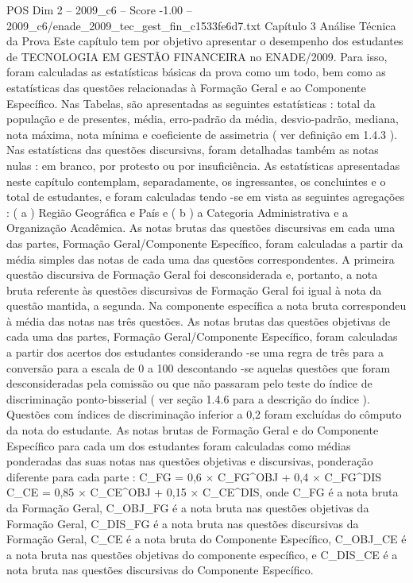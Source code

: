 \begin{textsample}{POS Dim 2 – 2009\_c6 – Score -1.00 – 2009\_c6/enade\_2009\_tec\_gest\_fin\_c1533fe6d7.txt}  \label{ex:f2_pos_304}
Capítulo 3 Análise Técnica da Prova Este capítulo tem por objetivo apresentar o desempenho dos estudantes de TECNOLOGIA EM GESTÃO FINANCEIRA no ENADE/2009.
Para isso, foram calculadas as estatísticas básicas da prova como um todo, bem como as estatísticas das questões relacionadas à Formação Geral e ao Componente Específico.
Nas Tabelas, são apresentadas as seguintes estatísticas : total da população e de presentes, média, erro-padrão da média, desvio-padrão, mediana, nota máxima, nota mínima e coeficiente de assimetria ( ver definição em 1.4.3 ).
Nas estatísticas das questões discursivas, foram detalhadas também as notas nulas : em branco, por protesto ou por insuficiência.
As estatísticas apresentadas neste capítulo contemplam, separadamente, os ingressantes, os concluintes e o total de estudantes, e foram calculadas tendo -se em vista as seguintes agregações : ( a ) Região Geográfica e País e ( b ) a Categoria Administrativa e a Organização Acadêmica.
As notas brutas das questões discursivas em cada uma das partes, Formação Geral/Componente Específico, foram calculadas a partir da média simples das notas de cada uma das questões correspondentes.
A primeira questão discursiva de Formação Geral foi desconsiderada e, portanto, a nota bruta referente às questões discursivas de Formação Geral foi igual à nota da questão mantida, a segunda.
Na componente específica a nota bruta correspondeu à média das notas nas três questões.
As notas brutas das questões objetivas de cada uma das partes, Formação Geral/Componente Específico, foram calculadas a partir dos acertos dos estudantes considerando -se uma regra de três para a conversão para a escala de 0 a 100 descontando -se aquelas questões que foram desconsideradas pela comissão ou que não passaram pelo teste do índice de discriminação ponto-bisserial ( ver seção 1.4.6 para a descrição do índice ).
Questões com índices de discriminação inferior a 0,2 foram excluídas do cômputo da nota do estudante.
As notas brutas de Formação Geral e do Componente Específico para cada um dos estudantes foram calculadas como médias ponderadas das suas notas nas questões objetivas e discursivas, ponderação diferente para cada parte : C\_FG = 0,6 × C\_FG\textasciicircum{}OBJ + 0,4 × C\_FG\textasciicircum{}DIS C\_CE = 0,85 × C\_CE\textasciicircum{}OBJ + 0,15 × C\_CE\textasciicircum{}DIS, onde C\_FG é a nota bruta da Formação Geral, C\_OBJ\_FG é a nota bruta nas questões objetivas da Formação Geral, C\_DIS\_FG é a nota bruta nas questões discursivas da Formação Geral, C\_CE é a nota bruta do Componente Específico, C\_OBJ\_CE é a nota bruta nas questões objetivas do componente específico, e C\_DIS\_CE é a nota bruta nas questões discursivas do Componente Específico.

\end{textsample}
